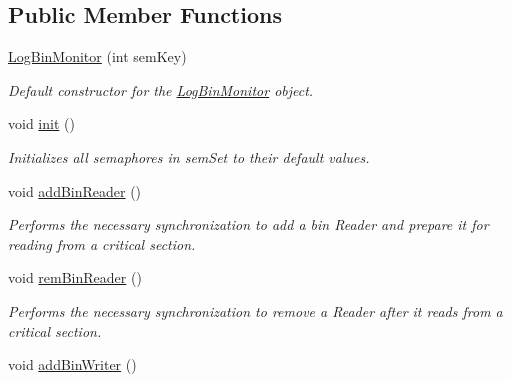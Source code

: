 \subsection*{Public Member Functions}
\begin{DoxyCompactItemize}
\item 
\hyperlink{classLogBinMonitor_a9b9460058da2a7808c218d3af8b6c8d1}{Log\-Bin\-Monitor} (int sem\-Key)
\begin{DoxyCompactList}\small\item\em Default constructor for the \hyperlink{classLogBinMonitor}{Log\-Bin\-Monitor} object. \end{DoxyCompactList}\item 
\hypertarget{classLogBinMonitor_a61f93501a153e0eb633c730ed4560aaf}{void \hyperlink{classLogBinMonitor_a61f93501a153e0eb633c730ed4560aaf}{init} ()}\label{classLogBinMonitor_a61f93501a153e0eb633c730ed4560aaf}

\begin{DoxyCompactList}\small\item\em Initializes all semaphores in sem\-Set to their default values. \end{DoxyCompactList}\item 
\hypertarget{classLogBinMonitor_ac8c0b581fdcc19a919c53e53415fc667}{void \hyperlink{classLogBinMonitor_ac8c0b581fdcc19a919c53e53415fc667}{add\-Bin\-Reader} ()}\label{classLogBinMonitor_ac8c0b581fdcc19a919c53e53415fc667}

\begin{DoxyCompactList}\small\item\em Performs the necessary synchronization to add a bin Reader and prepare it for reading from a critical section. \end{DoxyCompactList}\item 
\hypertarget{classLogBinMonitor_a5da1b371c5fc318b75a73f54c2e3f426}{void \hyperlink{classLogBinMonitor_a5da1b371c5fc318b75a73f54c2e3f426}{rem\-Bin\-Reader} ()}\label{classLogBinMonitor_a5da1b371c5fc318b75a73f54c2e3f426}

\begin{DoxyCompactList}\small\item\em Performs the necessary synchronization to remove a Reader after it reads from a critical section. \end{DoxyCompactList}\item 
\hypertarget{classLogBinMonitor_a3d72129f0b07e510bf406578b0e1cd11}{void \hyperlink{classLogBinMonitor_a3d72129f0b07e510bf406578b0e1cd11}{add\-Bin\-Writer} ()}\label{classLogBinMonitor_a3d72129f0b07e510bf406578b0e1cd11}


\end{DoxyCompactItemize}

